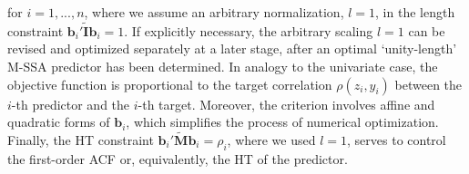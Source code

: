 \documentclass[11pt,a4paper]{article}
\begin{document}
for $i=1,...,n$, where we assume an arbitrary normalization, $l=1$, in the length constraint $\mathbf{b}_{i}'\tilde{\mathbf{I}}\mathbf{b}_{i}=1$. If explicitly necessary, the arbitrary scaling $l=1$ can be revised and optimized separately at a later stage, after an optimal `unity-length' M-SSA predictor has been determined. In analogy to the univariate case, the objective function is proportional to the target correlation $\rho(z_i,y_i)$ between the $i$-th predictor and the $i$-th target.  Moreover, the criterion involves affine and quadratic forms of $\mathbf{b}_i$, which simplifies the process of numerical optimization. Finally, the HT constraint $\mathbf{b}_{i}'\tilde{\mathbf{M}}\mathbf{b}_{i}=\rho_i$, where we used $l=1$, serves to control the first-order ACF or, equivalently, the HT of the predictor.  \\
\end{document}
